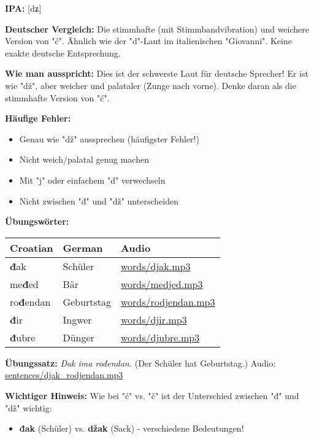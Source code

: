\begin{tcolorbox}[breakable, colback=lightblue!30, colframe=croatianblue, title=\textbf{Đ, đ}]

\textbf{IPA:} [dʑ]

\textbf{Deutscher Vergleich:}
Die stimmhafte (mit Stimmbandvibration) und weichere Version von "ć". Ähnlich wie der "d"-Laut im italienischen "Giovanni". Keine exakte deutsche Entsprechung.

\textbf{Wie man ausspricht:}
Dies ist der schwerste Laut für deutsche Sprecher! Er ist wie "dž", aber weicher und palataler (Zunge nach vorne). Denke daran als die stimmhafte Version von "ć".

\textbf{Häufige Fehler:}
\begin{itemize}
    \item Genau wie "dž" aussprechen (häufigster Fehler!)
    \item Nicht weich/palatal genug machen
    \item Mit "j" oder einfachem "d" verwechseln
    \item Nicht zwischen "đ" und "dž" unterscheiden
\end{itemize}

\textbf{Übungswörter:}
\begin{center}
\small
\begin{tabular}{lll}
\textbf{Croatian} & \textbf{German} & \textbf{Audio} \\
\midrule
\textbf{đ}ak & Schüler & \small\url{words/djak.mp3} \\
me\textbf{đ}ed & Bär & \small\url{words/medjed.mp3} \\
ro\textbf{đ}endan & Geburtstag & \small\url{words/rodjendan.mp3} \\
\textbf{đ}ir & Ingwer & \small\url{words/djir.mp3} \\
\textbf{đ}ubre & Dünger & \small\url{words/djubre.mp3} \\
\end{tabular}
\end{center}

\textbf{Übungssatz:}
\textit{Đak ima rođendan.}
(Der Schüler hat Geburtstag.)
Audio: \small\url{sentences/djak\_rodjendan.mp3}

\textbf{Wichtiger Hinweis:}
Wie bei "ć" vs. "č" ist der Unterschied zwischen "đ" und "dž" wichtig:
\begin{itemize}
    \item \textbf{đak} (Schüler) vs. \textbf{džak} (Sack) - verschiedene Bedeutungen!
\end{itemize}

\end{tcolorbox}

